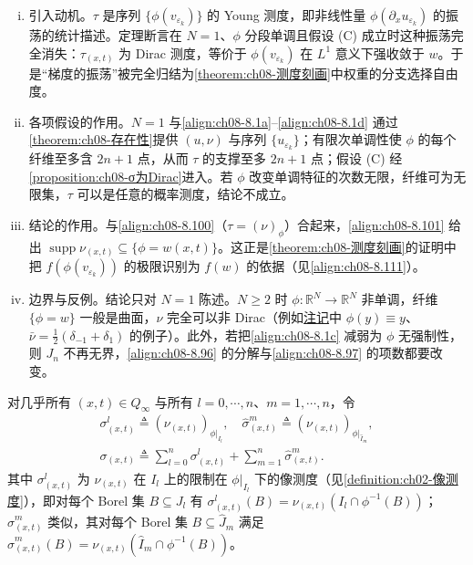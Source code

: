 \documentclass[../../main.tex]{subfiles}%
\begin{document}
\begin{remark}\label{remark:ch08-τ为Dirac}
\begin{enumerate}[(i)]
\item 引入动机。$\tau$ 是序列 $\{\phi(v_{\varepsilon_k})\}$ 的 Young 测度，即非线性量 $\phi(\partial_xu_{\varepsilon_k})$ 的振荡的统计描述。定理断言在 $N=1$、$\phi$ 分段单调且假设 (C) 成立时这种振荡完全消失：$\tau_{(x,t)}$ 为 Dirac 测度，等价于 $\phi(v_{\varepsilon_k})$ 在 $L^1$ 意义下强收敛于 $w$。于是“梯度的振荡”被完全归结为\cref{theorem:ch08-测度刻画}中权重的分支选择自由度。
\item 各项假设的作用。$N=1$ 与\eqref{align:ch08-8.1a}--\eqref{align:ch08-8.1d} 通过\cref{theorem:ch08-存在性}提供 $(u,\nu)$ 与序列 $\{u_{\varepsilon_k}\}$；有限次单调性使 $\phi$ 的每个纤维至多含 $2n+1$ 点，从而 $\tau$ 的支撑至多 $2n+1$ 点；假设 (C) 经\cref{proposition:ch08-σ为Dirac}进入。若 $\phi$ 改变单调特征的次数无限，纤维可为无限集，$\tau$ 可以是任意的概率测度，结论不成立。
\item 结论的作用。与\eqref{align:ch08-8.100}（$\tau=(\nu)_\phi$）合起来，\eqref{align:ch08-8.101} 给出 $\operatorname{supp}\nu_{(x,t)}\subseteq\{\phi=w(x,t)\}$。这正是\cref{theorem:ch08-测度刻画}的证明中把 $f(\phi(v_{\varepsilon_k}))$ 的极限识别为 $f(w)$ 的依据（见\eqref{align:ch08-8.111}）。
\item 边界与反例。结论只对 $N=1$ 陈述。$N\geqslant2$ 时 $\phi:\mathbb{R}^N\to\mathbb{R}^N$ 非单调，纤维 $\{\phi=w\}$ 一般是曲面，$\nu$ 完全可以非 Dirac（例如\hyperref[remark:ch08-Young测度值解]{注记}中 $\phi(y)\equiv y$、$\bar\nu=\frac12(\delta_{-1}+\delta_1)$ 的例子）。此外，若把\eqref{align:ch08-8.1c} 减弱为 $\phi$ 无强制性，则 $J_n$ 不再无界，\eqref{align:ch08-8.96} 的分解与\eqref{align:ch08-8.97} 的项数都要改变。
\end{enumerate}
\end{remark}

对几乎所有 $(x,t)\in Q_\infty$ 与所有 $l=0,\cdots ,n$、$m=1,\cdots ,n$，令
\begin{align}
\sigma^l_{(x,t)}\triangleq (\nu_{(x,t)})_{\phi|_{I_l}},\quad
\widehat\sigma^m_{(x,t)}\triangleq (\nu_{(x,t)})_{\phi|_{\widehat I_m}}, \label{align:ch08-8.102a}\\
\sigma_{(x,t)}\triangleq \sum_{l=0}^n\sigma^l_{(x,t)}+\sum_{m=1}^n\widehat\sigma^m_{(x,t)}. \label{align:ch08-8.102b}
\end{align}
其中 $\sigma^l_{(x,t)}$ 为 $\nu_{(x,t)}$ 在 $I_l$ 上的限制在 $\phi|_{I_l}$ 下的像测度（见\cref{definition:ch02-像测度}），即对每个 Borel 集 $B\subseteq J_l$ 有 $\sigma^l_{(x,t)}(B)=\nu_{(x,t)}(I_l\cap\phi^{-1}(B))$；$\widehat\sigma^m_{(x,t)}$ 类似，其对每个 Borel 集 $B\subseteq\widehat J_m$ 满足 $\widehat\sigma^m_{(x,t)}(B)=\nu_{(x,t)}(\widehat I_m\cap\phi^{-1}(B))$。
\end{document}
